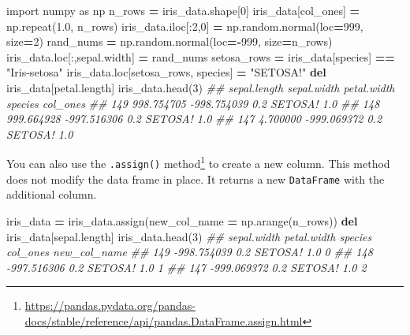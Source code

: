 \documentclass[
  12pt,
  krantz2]{krantz}
\makeatletter
\newenvironment{Shaded}{\begin{snugshade}}{\end{snugshade}}
\newcommand{\CommentTok}[1]{\textcolor[rgb]{0.37,0.37,0.37}{\textit{#1}}}
\newcommand{\DecValTok}[1]{\textcolor[rgb]{0.06,0.06,0.06}{#1}}
\newcommand{\FloatTok}[1]{\textcolor[rgb]{0.06,0.06,0.06}{#1}}
\newcommand{\ImportTok}[1]{#1}
\newcommand{\KeywordTok}[1]{\textcolor[rgb]{0.27,0.27,0.27}{\textbf{#1}}}
\newcommand{\NormalTok}[1]{#1}
\newcommand{\OperatorTok}[1]{\textcolor[rgb]{0.43,0.43,0.43}{\textbf{#1}}}
\newcommand{\StringTok}[1]{\textcolor[rgb]{0.5,0.5,0.5}{#1}}
\renewcommand{\href}[2]{#2\footnote{\url{#1}}}
\newenvironment{kframe}{%
\medskip{}
\setlength{\fboxsep}{.8em}
 \def\at@end@of@kframe{}%
 \ifinner\ifhmode%
  \def\at@end@of@kframe{\end{minipage}}%
  \begin{minipage}{\columnwidth}%
 \fi\fi%
 \def\FrameCommand##1{\hskip\@totalleftmargin \hskip-\fboxsep
 \colorbox{shadecolor}{##1}\hskip-\fboxsep
     \hskip-\linewidth \hskip-\@totalleftmargin \hskip\columnwidth}%
 \MakeFramed {\advance\hsize-\width
   \@totalleftmargin\z@ \linewidth\hsize
   \@setminipage}}%
 {\par\unskip\endMakeFramed%
 \at@end@of@kframe}
\renewenvironment{Shaded}{\begin{kframe}}{\end{kframe}}
\makeatother
\begin{document}
\begin{Shaded}
\begin{Highlighting}[]
\ImportTok{import}\NormalTok{ numpy }\ImportTok{as}\NormalTok{ np}
\NormalTok{n\_rows }\OperatorTok{=}\NormalTok{ iris\_data.shape[}\DecValTok{0}\NormalTok{]}
\NormalTok{iris\_data[}\StringTok{\textquotesingle{}col\_ones\textquotesingle{}}\NormalTok{] }\OperatorTok{=}\NormalTok{ np.repeat(}\FloatTok{1.0}\NormalTok{, n\_rows)}
\NormalTok{iris\_data.iloc[:}\DecValTok{2}\NormalTok{,}\DecValTok{0}\NormalTok{] }\OperatorTok{=}\NormalTok{  np.random.normal(loc}\OperatorTok{=}\DecValTok{999}\NormalTok{, size}\OperatorTok{=}\DecValTok{2}\NormalTok{)}
\NormalTok{rand\_nums }\OperatorTok{=}\NormalTok{ np.random.normal(loc}\OperatorTok{={-}}\DecValTok{999}\NormalTok{, size}\OperatorTok{=}\NormalTok{n\_rows)}
\NormalTok{iris\_data.loc[:,}\StringTok{\textquotesingle{}sepal.width\textquotesingle{}}\NormalTok{] }\OperatorTok{=}\NormalTok{ rand\_nums}
\NormalTok{setosa\_rows }\OperatorTok{=}\NormalTok{ iris\_data[}\StringTok{\textquotesingle{}species\textquotesingle{}}\NormalTok{] }\OperatorTok{==} \StringTok{"Iris{-}setosa"}
\NormalTok{iris\_data.loc[setosa\_rows, }\StringTok{\textquotesingle{}species\textquotesingle{}}\NormalTok{] }\OperatorTok{=} \StringTok{"SETOSA!"}
\KeywordTok{del}\NormalTok{ iris\_data[}\StringTok{\textquotesingle{}petal.length\textquotesingle{}}\NormalTok{]}
\NormalTok{iris\_data.head(}\DecValTok{3}\NormalTok{)}
\CommentTok{\#\#      sepal.length  sepal.width  petal.width  species  col\_ones}
\CommentTok{\#\# 149    998.754705  {-}998.754039          0.2  SETOSA!       1.0}
\CommentTok{\#\# 148    999.664928  {-}997.516306          0.2  SETOSA!       1.0}
\CommentTok{\#\# 147      4.700000  {-}999.069372          0.2  SETOSA!       1.0}
\end{Highlighting}
\end{Shaded}

You can also use the \href{https://pandas.pydata.org/pandas-docs/stable/reference/api/pandas.DataFrame.assign.html}{\texttt{.assign()} method} to create a new column. This method does not modify the data frame in place. It returns a new \texttt{DataFrame} with the additional column.

\begin{Shaded}
\begin{Highlighting}[]
\NormalTok{iris\_data }\OperatorTok{=}\NormalTok{ iris\_data.assign(new\_col\_name }\OperatorTok{=}\NormalTok{ np.arange(n\_rows))}
\KeywordTok{del}\NormalTok{ iris\_data[}\StringTok{\textquotesingle{}sepal.length\textquotesingle{}}\NormalTok{]}
\NormalTok{iris\_data.head(}\DecValTok{3}\NormalTok{)}
\CommentTok{\#\#      sepal.width  petal.width  species  col\_ones  new\_col\_name}
\CommentTok{\#\# 149  {-}998.754039          0.2  SETOSA!       1.0             0}
\CommentTok{\#\# 148  {-}997.516306          0.2  SETOSA!       1.0             1}
\CommentTok{\#\# 147  {-}999.069372          0.2  SETOSA!       1.0             2}
\end{Highlighting}
\end{Shaded}
\end{document}
